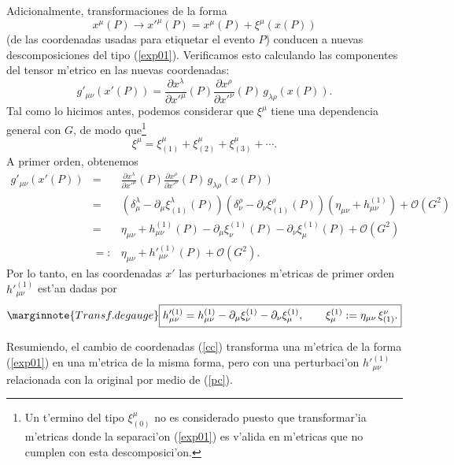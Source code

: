  Adicionalmente, transformaciones de la forma
\begin{equation}\label{cc}
x^\mu(P) \rightarrow x'^\mu(P)=x^\mu(P) + \xi^\mu(x(P))
\end{equation}
(de las coordenadas usadas para etiquetar el evento $P$) conducen a nuevas descomposiciones del tipo (\ref{exp01}). Verificamos esto calculando las componentes del tensor m'etrico en las nuevas coordenadas:
\begin{equation}
g'_{\mu\nu}(x' (P)) = \frac{\partial x^\lambda}{\partial
x'^\mu}(P) \frac{\partial x^\rho}{\partial x'^\nu}(P)\, g_{\lambda\rho}(x(P)).
\end{equation}
Tal como lo hicimos antes, podemos considerar que $\xi^\mu$ tiene una dependencia general con $G$, de modo que\footnote{Un t'ermino del tipo $\xi^\mu_{(0)}$ no es considerado puesto que transformar'ia m'etricas donde la separaci'on (\ref{exp01}) es v'alida en m'etricas que no cumplen con esta descomposici'on. }
\begin{equation}
\xi^\mu=\xi^\mu_{(1)}+\xi^\mu_{(2)}+\xi^\mu_{(3)}+\cdots.
\end{equation}
A primer orden, obtenemos
\begin{eqnarray}
g'_{\mu\nu}(x' (P))&=&\frac{\partial x^\lambda}{\partial
x'^\mu}(P)
\frac{\partial x^\rho}{\partial x'^\nu}(P)\, g_{\lambda\rho}(x(P)) \\
&=&\left(\delta^\lambda_\mu - \partial_\mu\xi^\lambda_{(1)}(P)
\right)\left(\delta^\rho_\nu -
\partial_\nu\xi^\rho_{(1)}(P) \right) \left(\eta_{\mu\nu} + h^{(1)}_{\mu\nu}\right) +
\mathcal{O}(G^2) \\
&=& \eta_{\mu\nu} + h^{(1)}_{\mu\nu}(P)- \partial_\mu\xi_\nu^{(1)}(P) - \partial_\nu
\xi_\mu^{(1)}(P)
+ \mathcal{O}(G^2) \\
&=:& \eta_{\mu\nu} + h'^{(1)}_{\mu\nu}(P)+ \mathcal{O}(G^2) .
\end{eqnarray}
Por lo tanto, en las coordenadas $x'$ las perturbaciones m'etricas de primer orden $h'^{(1)}_{\mu\nu}$ est'an dadas por
\begin{equation}\label{pc}\marginnote{Transf. de gauge}
\boxed{h'^{(1)}_{\mu\nu}=h^{(1)}_{\mu\nu}- \partial_\mu\xi_\nu^{(1)} - \partial_\nu\xi_\mu^{(1)} , \qquad \xi_\mu^{(1)}:=\eta_{\mu\nu}\, \xi^\nu_{(1)} .}
\end{equation}

Resumiendo, el cambio de coordenadas (\ref{cc}) transforma una m'etrica de la forma (\ref{exp01}) en una m'etrica de la misma forma, pero con una perturbaci'on $h'^{(1)}_{\mu\nu}$ relacionada con la original por medio de (\ref{pc}).



